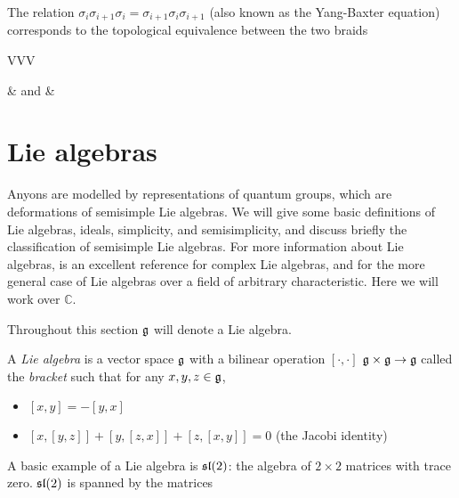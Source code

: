 
The relation $\sigma_i \sigma_{i+1} \sigma_i = \sigma_{i+1} \sigma_i
\sigma_{i+1}$ (also known as the Yang-Baxter equation) corresponds to the
topological equivalence between the two braids

\begin{center}
\begin{tabular}{VVV}
& and & 
\end{tabular}
\end{center}

\section{Lie algebras}

Anyons are modelled by representations of quantum groups, which are
deformations of semisimple Lie algebras. We will give some basic definitions of
Lie algebras, ideals, simplicity, and semisimplicity, and discuss briefly the
classification of semisimple Lie algebras.  For more information about Lie
algebras, \cite{Hall2003} is an excellent reference for complex Lie algebras,
and \cite{Humphreys1973} for the more general case of Lie algebras over a
field of arbitrary characteristic. Here we will work over $\mathbb{C}$.


Throughout this section $\mathfrak{g}$ will denote a Lie algebra.

A \emph{Lie algebra} is a vector space $\mathfrak{g}$ with a bilinear operation
$\left[ \cdot, \cdot \right]$  $\mathfrak{g} \times \mathfrak{g} \to
\mathfrak{g}$ called the \emph{bracket} such that for any $x,y,z\in \mathfrak{g}$,

\begin{itemize}
    \item $\left[ x,y \right] = -\left[ y,x \right]$
    \item $\left[ x, \left[ y,z \right] \right] + \left[ y, \left[ z,x \right] \right] + \left[ z, \left[ x,y \right] \right] = 0$ (the Jacobi identity)
\end{itemize}

A basic example of a Lie algebra is $\mathfrak{sl}(2)$: the algebra of $2 \times 2$
matrices with trace zero. $\mathfrak{sl}(2)$ is spanned by the matrices 

